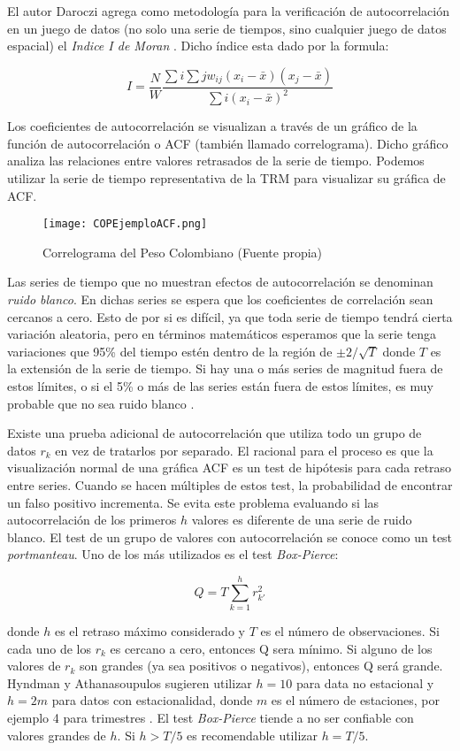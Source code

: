 \begin{spacing}{1.5}
El autor Daroczi agrega como metodología para la verificación de autocorrelación en un juego de datos (no solo una serie de tiempos, sino cualquier juego de datos espacial) el \emph{Indice I de Moran} \cite{daroczi}. Dicho índice esta dado por la formula:

\[ I = \frac{N}{W} 
	\frac{\sum{i}\sum{j}w_{ij}(x_{i} - \bar{x})(x_{j} - \bar{x})}{{\sum{i}(x_{i} - \bar{x})^2}} \]

Los coeficientes de autocorrelación se visualizan a través de un gráfico de la función de autocorrelación o ACF (también llamado correlograma). Dicho gráfico analiza las relaciones entre valores retrasados de la serie de tiempo. Podemos utilizar la serie de tiempo representativa de la TRM para visualizar su gráfica de ACF.

\begin{figure}[h!]
    \centering
    \texttt{[image: COPEjemploACF.png]}
    \caption{Correlograma del Peso Colombiano (Fuente propia)}
\end{figure}

Las series de tiempo que no muestran efectos de autocorrelación se denominan \emph{ruido blanco}. En dichas series se espera que los coeficientes de correlación sean cercanos a cero. Esto de por si es difícil, ya que toda serie de tiempo tendrá cierta variación aleatoria, pero en términos matemáticos esperamos que la serie tenga variaciones que 95\% del tiempo estén dentro de la región de $\pm2/\sqrt{T}$ donde $T$ es la extensión de la serie de tiempo. Si hay una o más series de magnitud fuera de estos límites, o si el 5\% o más de las series están fuera de estos límites, es muy probable que no sea ruido blanco \cite{hyndman}.

Existe una prueba adicional de autocorrelación que utiliza todo un grupo de datos $r_k$ en vez de tratarlos por separado. El racional para el proceso es que la visualización normal de una gráfica ACF es un test de hipótesis para cada retraso entre series. Cuando se hacen múltiples de estos test, la probabilidad de encontrar un falso positivo incrementa. Se evita este problema evaluando si las autocorrelación de los primeros $h$ valores es diferente de una serie de ruido blanco. El test de un grupo de valores con autocorrelación se conoce como un test \emph{portmanteau}. Uno de los más utilizados es el test \emph{Box-Pierce}:

\[ Q = T \sum_{k=1}^{h}r_{k\prime}^2 \]

donde $h$ es el retraso máximo considerado y $T$ es el número de observaciones. Si cada uno de los $r_k$ es cercano a cero, entonces Q sera mínimo. Si alguno de los valores de $r_k$ son grandes (ya sea positivos o negativos), entonces Q será grande. Hyndman y Athanasoupulos sugieren utilizar $h = 10$ para data no estacional y $h = 2m$ para datos con estacionalidad, donde $m$ es el número de estaciones, por ejemplo 4 para trimestres \cite{hyndman}.  El test \emph{Box-Pierce} tiende a no ser confiable con valores grandes de $h$. Si $h > T/5$ es recomendable utilizar $h=T/5$.


\end{spacing}

